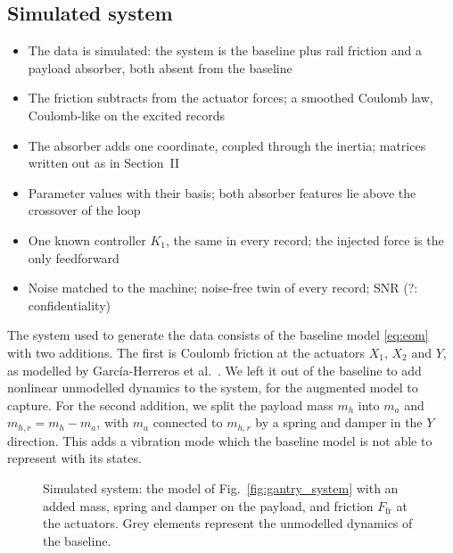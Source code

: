 \subsection{Simulated system}\label{sec:setup_system}
\ifdraft
\begin{itemize}
\item The data is simulated: the system is the baseline plus rail friction and a payload absorber, both absent from the baseline
\item The friction subtracts from the actuator forces; a smoothed Coulomb law, Coulomb-like on the excited records
\item The absorber adds one coordinate, coupled through the inertia; matrices written out as in Section~II
\item Parameter values with their basis; both absorber features lie above the crossover of the loop
\item One known controller $K_1$, the same in every record; the injected force is the only feedforward
\item Noise matched to the machine; noise-free twin of every record; SNR (?: confidentiality)
\end{itemize}
\fi
The system used to generate the data consists of the baseline model \eqref{eq:eom}
with two additions.
The first is Coulomb friction at the actuators $X_1$, $X_2$ and $Y$, as
modelled by Garc\'ia-Herreros et al.~\cite{garcia2013model}.
We left it out of the baseline to add nonlinear unmodelled dynamics to the
system, for the augmented model to capture.
%
For the second addition, we split the payload mass $m_h$ into
$m_a$ and $m_{h,r}=m_h-m_a$, with $m_a$ connected to $m_{h,r}$
by a spring and damper in the $Y$ direction.
This adds a vibration mode which the 
baseline model is not able to represent with its states.
\begin{figure}[t]
  \centering
  \resizebox{\columnwidth}{!}{}
  \caption{Simulated system: the model of Fig.~\ref{fig:gantry_system}
  with an added mass, spring and damper on the payload, and friction
  $F_{\mathrm{fr}}$ at the actuators. Grey elements represent the
  unmodelled dynamics of the baseline.}
  \label{fig:gantry_absorber}
\end{figure}
